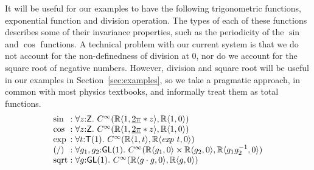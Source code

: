 \documentclass{sigplanconf}
\theoremstyle{examplestyle}
\begin{document}
It will be useful for our examples to have the following trigonometric
functions, exponential function and division operation. The types of
each of these functions describes some of their invariance properties,
such as the periodicity of the $\sin$ and $\cos$ functions. A
technical problem with our current system is that we do not account
for the non-definedness of division at $0$, nor do we account for the
square root of negative numbers. However, division and square root
will be useful in our examples in Section~\ref{sec:examples}, so we
take a pragmatic approach, in common with most physics textbooks, and
informally treat them as total functions.
\begin{displaymath}
  \begin{array}{l@{\hspace{0.3em}}c@{\hspace{0.3em}}l}
    \sin &:& \forall z \mathord: \mathsf{Z}.~C^\infty(\mathbb{R}\langle 1, \underline{2\pi} * z \rangle, \mathbb{R} \langle 1, 0 \rangle) \\
    \cos &:& \forall z \mathord: \mathsf{Z}.~C^\infty(\mathbb{R}\langle 1, \underline{2\pi} * z \rangle, \mathbb{R} \langle 1, 0 \rangle) \\
    \mathrm{exp} &:& \forall t \mathord: \mathsf{T}(1).~C^\infty(\mathbb{R}\langle 1, t \rangle, \mathbb{R}\langle \mathit{exp}~t, 0 \rangle) \\
    (/) &:& \forall g_1, g_2 \mathord: \mathsf{GL}(1).~C^\infty(\mathbb{R}\langle g_1, 0 \rangle \times \mathbb{R}\langle g_2, 0\rangle, \mathbb{R}\langle g_1g_2^{-1}, 0 \rangle) \\
    \mathrm{sqrt} &:& \forall g \mathord: \mathsf{GL}(1).~C^\infty(\mathbb{R}\langle g\cdot g, 0 \rangle, \mathbb{R}\langle g, 0 \rangle)
  \end{array}
\end{displaymath}
\end{document}
